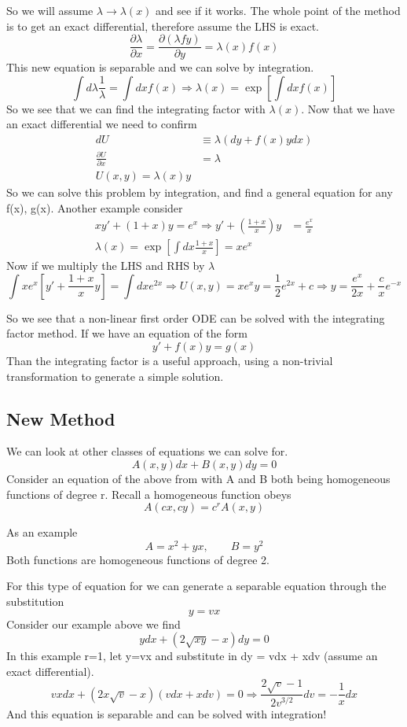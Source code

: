 \documentclass{article}
\newcommand{\be}{\begin{equation}}
\newcommand{\ee}{\end{equation}}
\newcommand{\pd}{\partial}
\begin{document}
So we will assume $\lambda \rightarrow \lambda(x)$ and see if it works.
The whole point of the method is to get an exact differential, therefore assume the LHS is exact.
\be
\frac{\pd\lambda}{\pd x} = \frac{\pd (\lambda f y)}{\pd y} = \lambda(x) f(x)
\ee
This new equation is separable and we can solve by integration.
\be
\int d\lambda \frac{1}{\lambda} = \int dx f(x) \Rightarrow \lambda(x) = \exp\left[\int dx f(x)\right]
\ee
So we see that we can find the integrating factor with $\lambda(x)$.
Now that we have an exact differential we need to confirm
\be
\begin{split}
    dU &\equiv \lambda(dy + f(x)ydx)\\
    \frac{\pd U}{\pd x} &= \lambda\\
    U(x,y) = \lambda(x) y
\end{split}
\ee
So we can solve this problem by integration, and find a general equation for any f(x), g(x). Another example consider
\be
\begin{split}
    xy' + (1+x) y = e^x \Rightarrow y' + \left(\frac{1+x}{x}\right)y &= \frac{e^x}{x}\\
    \lambda(x) = \exp\left[ \int dx \frac{1+x}{x} \right] = xe^x
\end{split}
\ee
Now if we multiply the LHS and RHS by $\lambda$
\be
\int xe^x\left[y' + \frac{1+x}{x} y\right] = \int dx e^{2x} \Rightarrow U(x,y) = xe^xy = \frac{1}{2} e^{2x} + c \Rightarrow y = \frac{e^x}{2x} + \frac{c}{x} e^{-x}
\ee

So we see that a non-linear first order ODE can be solved with the integrating factor method.
If we have an equation of the form
\be
y' + f(x)y = g(x)
\ee
Than the integrating factor is a useful approach, using a non-trivial transformation to generate a simple solution.

\subsection*{New Method}
We can look at other classes of equations we can solve for.
\be
A(x,y)dx + B(x,y)dy = 0
\ee
Consider an equation of the above from with A and B both being homogeneous functions of degree r.
Recall a homogeneous function obeys
\be
A(cx,cy) = c^r A(x,y)
\ee

As an example
\be
A = x^2 + yx, \qquad B = y^2
\ee
Both functions are homogeneous functions of degree 2.

For this type of equation for we can generate a separable equation through the substitution
\be
y = vx
\ee
Consider our example above we find
\be
ydx + (2\sqrt{xy} - x) dy = 0
\ee
In this example r=1, let y=vx and substitute in dy = vdx + xdv (assume an exact differential).
\be
vxdx + (2x\sqrt{v} - x) (vdx + xdv) = 0 \Rightarrow \frac{2\sqrt{v}-1}{2v^{3/2}}dv = -\frac{1}{x} dx
\ee
And this equation is separable and can be solved with integration!
\end{document}
